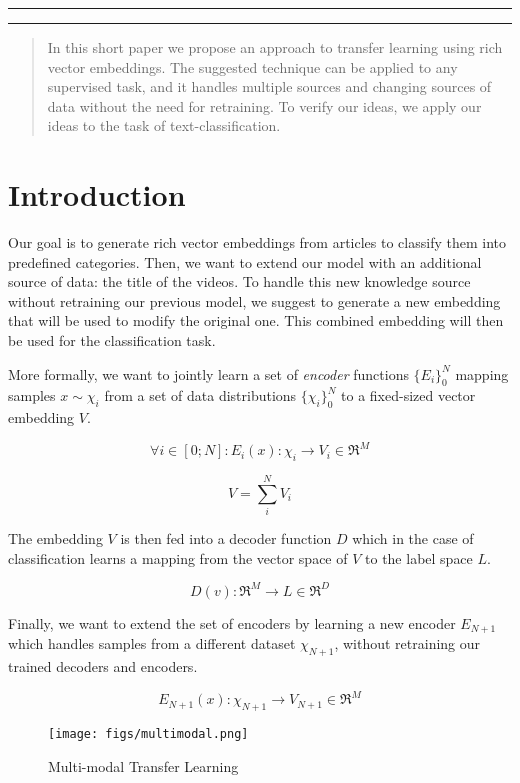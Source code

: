 \documentclass[12pt]{article}
\makeatletter
\def\maketitle{
    \begin{centering}
    \par\rule{\textwidth}{2pt}
    \par\hfill
    \par\textbf{\LARGE\@title}
    \par\hfill
    \par{\textit{\@author}}
    \par\hfill
    \par{\@date}
    \par\rule{\textwidth}{2pt}
    \end{centering}
}
\makeatother
\begin{document}
\thispagestyle{empty}
\maketitle
\hfill
\begin{abstract}
In this short paper we propose an approach to transfer learning using rich
vector embeddings. The suggested technique can be applied to any supervised
task, and it handles multiple sources and changing sources of data without the
need for retraining. To verify our ideas, we apply our ideas to the task of
text-classification.
\end{abstract}

\section{Introduction}\label{introduction}

Our goal is to generate rich vector embeddings from articles to classify
them into predefined categories. Then, we want to extend our model with
an additional source of data: the title of the videos. To handle this
new knowledge source without retraining our previous model, we suggest
to generate a new embedding that will be used to modify the original
one. This combined embedding will then be used for the classification
task.

More formally, we want to jointly learn a set of \emph{encoder}
functions $\{E_i\}_0^N$ mapping samples $x \sim \chi_i$ from a set of
data distributions $\{\chi_i\}_0^N$ to a fixed-sized vector embedding
$V$.

\[ \forall i \in [0; N]: E_i(x): \chi_i \rightarrow V_i \in \Re^M\]

\[V = \sum_i^N V_i\]

The embedding $V$ is then fed into a decoder function $D$ which in the
case of classification learns a mapping from the vector space of $V$ to
the label space $L$.

\[ D(v): \Re^M \rightarrow L \in \Re^D\]

Finally, we want to extend the set of encoders by learning a new encoder
$E_{N+1}$ which handles samples from a different dataset $\chi_{N+1}$,
without retraining our trained decoders and encoders.

\[ E_{N+1}(x): \chi_{N+1} \rightarrow V_{N+1} \in \Re^M\]

\begin{figure}[htbp]
\centering
\texttt{[image: figs/multimodal.png]}
\caption{Multi-modal Transfer Learning}
\end{figure}
\end{document}
